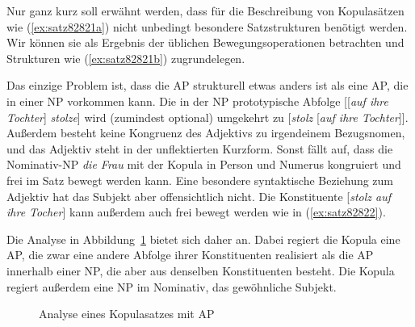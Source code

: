 \label{sec:kopulakonstruktionen}


Nur ganz kurz soll erwähnt werden, dass für die Beschreibung von Kopulasätzen wie (\ref{ex:satz82821a}) nicht unbedingt besondere Satzstrukturen benötigt werden.
Wir können sie als Ergebnis der üblichen Bewegungsoperationen betrachten und Strukturen wie (\ref{ex:satz82821b}) zugrundelegen.

\begin{exe}
  \ex\label{ex:satz82821} 
  \begin{xlist}
  \end{xlist}
\end{exe}

Das einzige Problem ist, dass die AP strukturell etwas anders ist als eine AP, die in einer NP vorkommen kann.
Die in der NP prototypische Abfolge [[\textit{auf ihre Tochter}] \textit{stolze}] wird (zumindest optional) umgekehrt zu [\textit{stolz} [\textit{auf ihre Tochter}]].
Außerdem besteht keine Kongruenz des Adjektivs zu irgendeinem Bezugsnomen, und das Adjektiv steht in der unflektierten Kurzform.
Sonst fällt auf, dass die Nominativ-NP \textit{die Frau} mit der Kopula in Person und Numerus kongruiert und frei im Satz bewegt werden kann.
Eine besondere syntaktische Beziehung zum Adjektiv hat das Subjekt aber offensichtlich nicht.
Die Konstituente [\textit{stolz auf ihre Tocher}] kann außerdem auch frei bewegt werden wie in (\ref{ex:satz82822}).

\begin{exe}
\end{exe}

Die Analyse in Abbildung~\ref{fig:kopulav22} bietet sich daher an.
Dabei regiert die Kopula eine AP, die zwar eine andere Abfolge ihrer Konstituenten realisiert als die AP innerhalb einer NP, die aber aus denselben Konstituenten besteht.
Die Kopula regiert außerdem eine NP im Nominativ, das gewöhnliche Subjekt.

\begin{figure}[h!]
  \caption{Analyse eines Kopulasatzes mit AP}
  \label{fig:kopulav22}
\end{figure}

